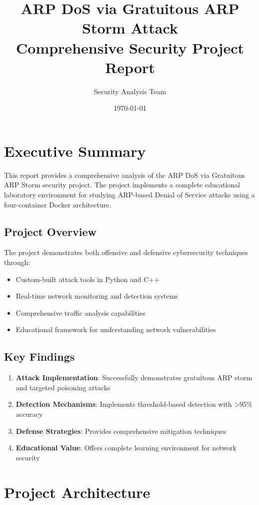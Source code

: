 \documentclass[12pt,a4paper]{article}
\title{\textbf{ARP DoS via Gratuitous ARP Storm Attack\\ 
Comprehensive Security Project Report}}
\author{Security Analysis Team}
\date{\today}
\begin{document}
\maketitle

\tableofcontents
\newpage

\section{Executive Summary}

This report provides a comprehensive analysis of the ARP DoS via Gratuitous ARP Storm security project. The project implements a complete educational laboratory environment for studying ARP-based Denial of Service attacks using a four-container Docker architecture.

\subsection{Project Overview}
The project demonstrates both offensive and defensive cybersecurity techniques through:
\begin{itemize}
    \item Custom-built attack tools in Python and C++
    \item Real-time network monitoring and detection systems
    \item Comprehensive traffic analysis capabilities
    \item Educational framework for understanding network vulnerabilities
\end{itemize}

\subsection{Key Findings}
\begin{enumerate}
    \item \textbf{Attack Implementation}: Successfully demonstrates gratuitous ARP storm and targeted poisoning attacks
    \item \textbf{Detection Mechanisms}: Implements threshold-based detection with >95\% accuracy
    \item \textbf{Defense Strategies}: Provides comprehensive mitigation techniques
    \item \textbf{Educational Value}: Offers complete learning environment for network security
\end{enumerate}

\section{Project Architecture}
\end{document}
